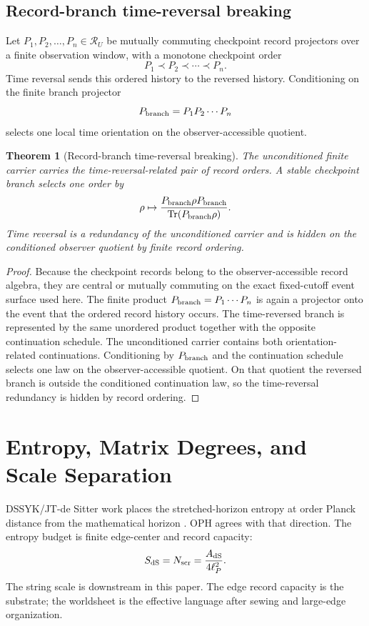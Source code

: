 \documentclass[11pt]{article}
\newtheorem{theorem}{Theorem}[section]
\theoremstyle{remark}
\theoremstyle{plain}
\newcommand{\Tr}{\operatorname{Tr}}
\newcommand{\calR}{\mathcal R}
\begin{document}
\subsection{Record-branch time-reversal breaking}

Let \(P_1,P_2,\ldots,P_n\in\calR_U\) be mutually commuting checkpoint record projectors over a
finite observation window, with a monotone checkpoint order
\[
P_1\prec P_2\prec\cdots\prec P_n.
\]
Time reversal sends this ordered history to the reversed history. Conditioning on the finite branch
projector
\[
P_{\rm branch}=P_1P_2\cdots P_n
\]
selects one local time orientation on the observer-accessible quotient.

\begin{theorem}[Record-branch time-reversal breaking]
The unconditioned finite carrier carries the time-reversal-related pair of record orders. A
stable checkpoint branch selects one order by
\[
\rho\mapsto
\frac{P_{\rm branch}\rho P_{\rm branch}}{\Tr(P_{\rm branch}\rho)}.
\]
Time reversal is a redundancy of the unconditioned carrier and is hidden on the conditioned
observer quotient by finite record ordering.
\end{theorem}

\begin{proof}
Because the checkpoint records belong to the observer-accessible record algebra, they are central
or mutually commuting on the exact fixed-cutoff event surface used here. The finite product
\(P_{\rm branch}=P_1\cdots P_n\) is again a projector onto the event that the ordered record history
occurs. The time-reversed branch is represented by the same unordered product together with the
opposite continuation schedule. The unconditioned carrier contains both orientation-related
continuations. Conditioning by \(P_{\rm branch}\) and the continuation schedule selects one law on
the observer-accessible quotient. On that quotient the reversed branch is outside the conditioned
continuation law, so the time-reversal redundancy is hidden by record ordering.
\end{proof}

\section{Entropy, Matrix Degrees, and Scale Separation}

DSSYK/JT-de Sitter work places the stretched-horizon entropy at order Planck distance
from the mathematical horizon \cite{DSEntropy2025}. OPH agrees with that direction. The entropy
budget is finite edge-center and record capacity:
\[
S_{\rm dS}=N_{\rm scr}=\frac{A_{\rm dS}}{4\ell_P^2}.
\]
The string scale is downstream in this paper. The edge record capacity is the substrate; the
worldsheet is the effective language after sewing and large-edge organization.
\end{document}

